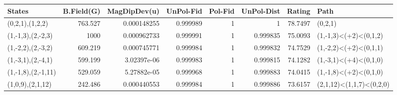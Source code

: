 \begin{tabular}{lrrrrrrl}
\hline
 States             &   B.Field(G) &   MagDipDev(u) &   UnPol-Fid &   Pol-Fid &   UnPol-Dist &   Rating & Path                     \\
\hline
 (0,2,1),(1,2,2)    &      763.527 &    0.000148255 &    0.999989 &         1 &     1        &  78.7497 & (0,2,1)                  \\
 (1,-1,3),(2,-2,3)  &     1000     &    0.000962733 &    0.999991 &         1 &     0.999835 &  75.0093 & (1,-1,3)<(+2)<(0,1,2)    \\
 (1,-2,2),(2,-3,2)  &      609.219 &    0.000745771 &    0.999984 &         1 &     0.999832 &  74.7529 & (1,-2,2)<(+2)<(0,1,1)    \\
 (1,-3,1),(2,-4,1)  &      599.199 &    3.02397e-06 &    0.999983 &         1 &     0.999815 &  74.1282 & (1,-3,1)<(+4)<(0,1,0)    \\
 (1,-1,8),(2,-1,11) &      529.059 &    5.27882e-05 &    0.999968 &         1 &     0.999883 &  74.0415 & (1,-1,8)<(+2)<(0,1,0)    \\
 (1,0,9),(2,1,12)   &      242.486 &    0.000440553 &    0.999984 &         1 &     0.999886 &  73.6157 & (2,1,12)<(1,1,7)<(0,2,0) \\
\hline
\end{tabular}